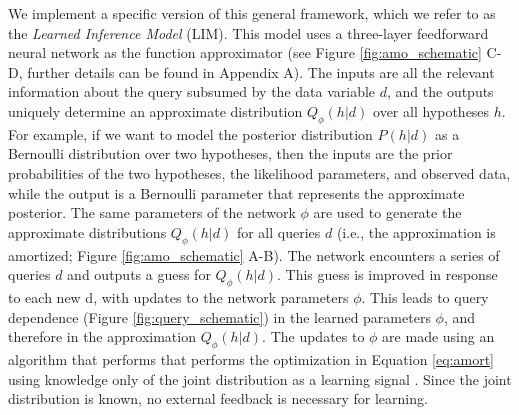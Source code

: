 We implement a specific version of this general framework, which we refer to as the \emph{Learned Inference Model} (LIM). This model uses a three-layer feedforward neural network as the function approximator (see Figure \ref{fig:amo_schematic} C-D, further details can be found in Appendix A). The inputs are all the relevant information about the query subsumed by the data variable $d$, and the outputs uniquely determine an approximate distribution $Q_\phi(h|d)$ over all hypotheses $h$. For example, if we want to model the posterior distribution $P(h|d)$ as a Bernoulli distribution over two hypotheses, then the inputs are the prior probabilities of the two hypotheses, the likelihood parameters, and observed data, while the output is a Bernoulli parameter that represents the approximate posterior. The same parameters of the network $\phi$ are used to generate the approximate distributions $Q_\phi(h|d)$ for all queries $d$ (i.e., the approximation is amortized; Figure \ref{fig:amo_schematic} A-B). The network encounters a series of queries $d$ and outputs a guess for $Q_\phi(h|d)$. This guess is improved in response to each new d, with updates to the network parameters $\phi$. This leads to query dependence (Figure \ref{fig:query_schematic}) in the learned parameters $\phi$, and therefore in the approximation $Q_\phi(h|d)$. The updates to $\phi$ are made using an algorithm that performs that performs the optimization in Equation \ref{eq:amort} using knowledge only of the joint distribution as a learning signal \citep[][, see Appendix A for details]{ranganath2014black}. Since the joint distribution is known, no external feedback is necessary for learning.


